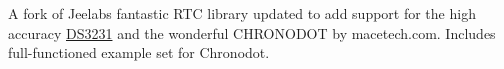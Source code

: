 A fork of Jeelab\textquotesingle{}s fantastic R\+TC library updated to add support for the high accuracy \hyperlink{class_d_s3231}{D\+S3231} and the wonderful C\+H\+R\+O\+N\+O\+D\+OT by macetech.\+com. Includes full-\/functioned example set for Chronodot. 